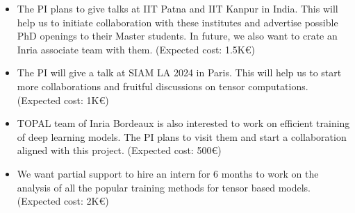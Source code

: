\begin{itemize}
	\item The PI plans to give talks at IIT Patna and IIT Kanpur in India. This will help us to initiate collaboration with these institutes and advertise possible PhD openings to their Master students. In future, we also want to crate an Inria associate team with them. (Expected cost: 1.5K\euro)

	\item The PI will give a talk at SIAM LA 2024 in Paris. This will help us to start more collaborations and fruitful discussions on tensor computations. (Expected cost: 1K\euro)
	
	\item TOPAL team of Inria Bordeaux is also interested to work on efficient training of deep learning models. The PI plans to visit them and start a collaboration aligned with this project. (Expected cost: 500\euro)
	
	\item We want partial support to hire an intern for $6$ months to work on the analysis of all the popular training methods for tensor based models. (Expected cost: 2K\euro)
\end{itemize} 


%




{\footnotesize }


